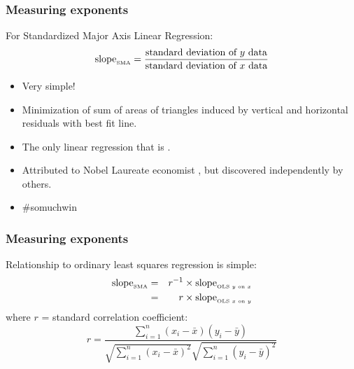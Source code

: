 \begin{frame}
  \frametitle{Measuring exponents}

  \begin{block}{For Standardized Major Axis Linear Regression:}
    $$
    \mbox{slope}_{\mbox{\tiny SMA}}
    =
    \frac{
      \mbox{standard deviation of $y$ data}
    }
    {
      \mbox{standard deviation of $x$ data}
    }
    $$
    \begin{itemize}
    \item<+-> 
      Very simple!
    \item<+-> 
      Minimization of sum of areas of triangles induced by
      vertical and horizontal residuals with best fit line.
    \item<+-> 
      The only linear regression that is 
      .
    \item<+-> 
      Attributed to Nobel Laureate economist
      ,\cite{samuelson1942a}
      but discovered independently
      by others.
    \item<+-> 
      \#somuchwin
    \end{itemize}
  \end{block}

\end{frame}

\begin{frame}
  \frametitle{Measuring exponents}

  \begin{block}{Relationship to ordinary least squares regression is simple:}
  \begin{eqnarray*}
    \mbox{slope}_{\mbox{\tiny SMA}} & = & r^{-1} \times 
    \mbox{slope}_{\mbox{\tiny OLS $y$ on $x$}} \\ 
    & = & r \times \mbox{slope}_{\mbox{\tiny OLS $x$ on $y$}}
  \end{eqnarray*} \inv
  where $r$ = standard correlation coefficient:
  $$
  r = \frac{
    \sum_{i=1}^{n} (x_i - \bar{x})(y_i - \bar{y})
  }
  {
    \sqrt{\sum_{i=1}^{n} (x_i - \bar{x})^2}
    \sqrt{\sum_{i=1}^{n} (y_i - \bar{y})^2}
  }
  $$
  \end{block}

\end{frame}

